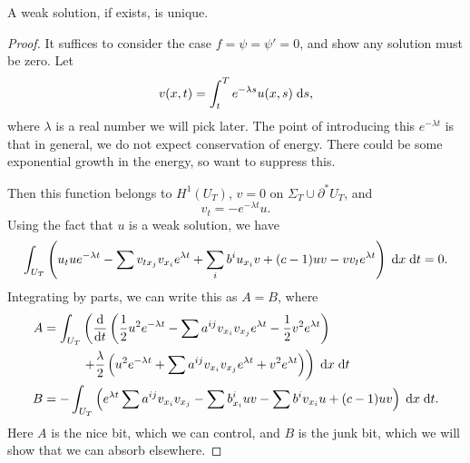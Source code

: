 \documentclass[a4paper]{article}
\begin{document}
\begin{thm}
  A weak solution, if exists, is unique.
\end{thm}

\begin{proof}
  It suffices to consider the case $f = \psi = \psi' = 0$, and show any solution must be zero. Let
  \[
    v(x, t) = \int_t^T e^{-\lambda s} u(x, s)\;\mathrm{d} s,
  \]
  where $\lambda$ is a real number we will pick later. The point of introducing this $e^{-\lambda t}$ is that in general, we do not expect conservation of energy. There could be some exponential growth in the energy, so want to suppress this.

  Then this function belongs to $H^1(U_T)$, $v = 0$ on $\Sigma_T \cup \partial^* U_T$, and
  \[
    v_t = -e^{-\lambda t} u.
  \]
  Using the fact that $u$ is a weak solution, we have
  \[
    \int_{U_T} \left( u_t u e^{- \lambda t} - \sum v_{t x_j} v_{x_i} e^{\lambda t} + \sum_i b^i u_{x_i} v + (c - 1) uv - v v_t e^{\lambda t}\right)\;\mathrm{d} x \;\mathrm{d} t = 0.
  \]
  Integrating by parts, we can write this as $A = B$, where
  \begin{align*}
    A &= \int_{U_T} \left( \frac{\d}{\d t} \left(\frac{1}{2} u^2 e^{-\lambda t} - \sum a^{ij} v_{x_i} v_{x_j} e^{\lambda t} - \frac{1}{2} v^2 e^{\lambda t}\right) \right.\\
    &\phantomeq \hphantom{\int_{U_T}} \left.+ \frac{\lambda}{2} \left(u^2 e^{-\lambda t} + \sum a^{ij} v_{x_i} v_{x_j} e^{\lambda t} + v^2 e^{\lambda t}\right)\right) \;\d x\;\d t\\
    B &= - \int_{U_T} \left(e^{\lambda t} \sum a^{ij} v_{x_i} v_{x_j} - \sum b^i_{x_i} uv - \sum b^i v_{x_i} u + (c - 1) uv\right) \;\d x\;\d t.
  \end{align*}
  Here $A$ is the nice bit, which we can control, and $B$ is the junk bit, which we will show that we can absorb elsewhere.


\end{proof}
\end{document}
